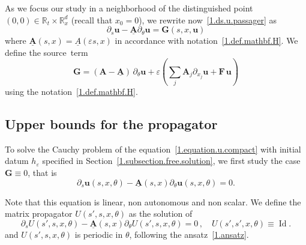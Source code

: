 \documentclass[AHL,Unicode,longabstracts,published]{cedram}
\theoremstyle{plain}
\newcommand*\e{\varepsilon}
\newcommand*\R{{\mathbb R}}
\newcommand{\dptl}{\partial}%
\newcommand{\ubf}{{\mathbf u}}
\newcommand*\und{\underline}
\DeclareMathOperator{\Id}{Id}
\begin{document}
As we focus our study in a neighborhood of the distinguished point $(0,0)\in\R_{t}\times\R^{d}_{x}$ (recall that $x_0 = 0$), we rewrite now~\eqref{1.ds.u.passager} as
\begin{equation}\label{1.equation.u.compact}
\dptl_{s} \ubf - \und{{\mathbf A}} \dptl_{\theta} \ubf = {\mathbf G}(s,x,\ubf)
\end{equation}
where $\und{{\mathbf A}}(s,x) = \und{A}(\e s,x)$ in accordance with notation~\eqref{1.def.mathbf.H}. We define the source~term
\begin{equation}\label{1.def.G}
{\mathbf G} = \left({\mathbf A} - \und{{\mathbf A}} \right)\,\dptl_{\theta} \ubf + \e\left(\sum_j {\mathbf A}_j \dptl_{x_j} \ubf + {\mathbf F} \, \ubf\right)
\end{equation}
using the notation~\eqref{1.def.mathbf.H}.



\subsection{Upper bounds for the propagator}



To solve the Cauchy problem of the equation~\eqref{1.equation.u.compact} with initial datum $h_{\e}$ specified in Section~\ref{1.subsection.free.solution}, we first study the case ${\mathbf G} \equiv 0$, that is
\begin{equation}\label{1.equation.free}
\dptl_{s} \ubf(s,x,\theta) - \und{{\mathbf A}}(s,x) \dptl_{\theta} \ubf(s,x,\theta) = 0.
\end{equation}


Note that this equation is linear, non autonomous and non scalar. We define the matrix propagator $U(s',s,x,\theta)$ as the solution of
\begin{equation}\label{1.equation.propagator}
\dptl_{s} U(s',s,x,\theta) - \und{{\mathbf A}}(s,x) \dptl_{\theta} U(s',s,x,\theta) = 0 \,, \quad U(s',s',x,\theta) \equiv {\Id}.
\end{equation}
and $U(s',s,x,\theta)$ is periodic in $\theta$, following the ansatz~\eqref{1.ansatz}.
\end{document}
